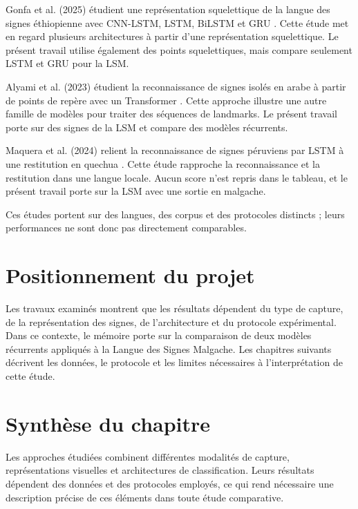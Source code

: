 Gonfa et al. (2025) étudient une représentation squelettique de la langue des signes éthiopienne avec CNN-LSTM, LSTM, BiLSTM et GRU \cite{Gonfa2025Ethiopian}. Cette étude met en regard plusieurs architectures à partir d'une représentation squelettique. Le présent travail utilise également des points squelettiques, mais compare seulement LSTM et GRU pour la LSM.

Alyami et al. (2023) étudient la reconnaissance de signes isolés en arabe à partir de points de repère avec un Transformer \cite{Alyami2023Arabic}. Cette approche illustre une autre famille de modèles pour traiter des séquences de landmarks. Le présent travail porte sur des signes de la LSM et compare des modèles récurrents.

Maquera et al. (2024) relient la reconnaissance de signes péruviens par LSTM à une restitution en quechua \cite{Maquera2024LSP}. Cette étude rapproche la reconnaissance et la restitution dans une langue locale. Aucun score n'est repris dans le tableau, et le présent travail porte sur la LSM avec une sortie en malgache.

Ces études portent sur des langues, des corpus et des protocoles distincts ; leurs performances ne sont donc pas directement comparables.

\section{Positionnement du projet}

Les travaux examinés montrent que les résultats dépendent du type de capture, de la représentation des signes, de l'architecture et du protocole expérimental. Dans ce contexte, le mémoire porte sur la comparaison de deux modèles récurrents appliqués à la Langue des Signes Malgache. Les chapitres suivants décrivent les données, le protocole et les limites nécessaires à l'interprétation de cette étude.

\section{Synthèse du chapitre}

Les approches étudiées combinent différentes modalités de capture, représentations visuelles et architectures de classification. Leurs résultats dépendent des données et des protocoles employés, ce qui rend nécessaire une description précise de ces éléments dans toute étude comparative.
